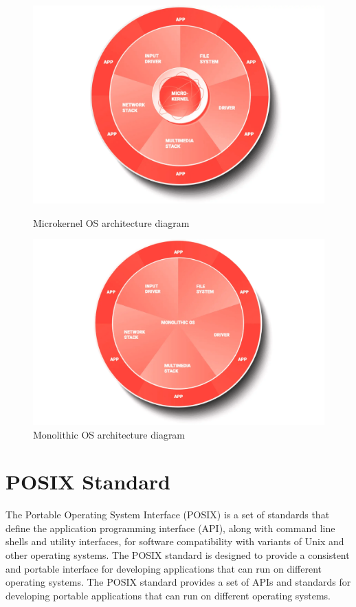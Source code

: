 \documentclass{article}
\begin{document}
\begin{figure}[h!]
    \centering
    \begin{minipage}{0.45\textwidth}
        \centering
        \includegraphics[width=\textwidth]{graph1.png} %
        \caption{Microkernel OS architecture diagram \cite{WhatsRTOS2024}}
        \label{fig:microkernel}
    \end{minipage}
    \hfill
    \begin{minipage}{0.45\textwidth}
        \centering
        \includegraphics[width=\textwidth]{graph3.png} %
        \caption{Monolithic OS architecture diagram \cite{WhatsRTOS2024}}
        \label{fig:monolithic}
    \end{minipage}
\end{figure}
\FloatBarrier

\section{POSIX Standard}
\label{sec:posix-standard}
The Portable Operating System Interface (POSIX) is a set of standards that define the application programming interface (API), along with command line shells and utility interfaces, for software compatibility with variants of Unix and other operating systems.
The POSIX standard is designed to provide a consistent and portable interface for developing applications that can run on different operating systems.
The POSIX standard provides a set of APIs and standards for developing portable applications that can run on different operating systems.
\end{document}
